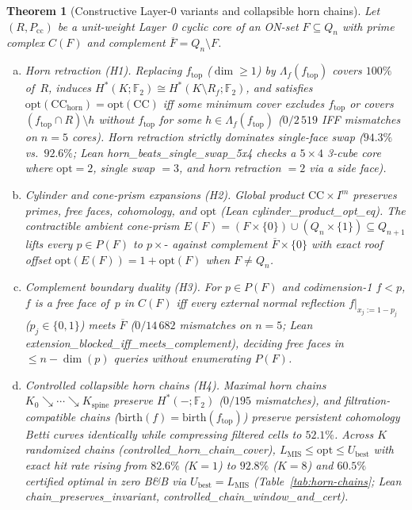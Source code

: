 \documentclass[11pt]{article}
\newtheorem{theorem}{Theorem}
\begin{document}
\begin{theorem}[Constructive Layer-0 variants and collapsible horn chains]
\label{thm:horn-chains}
Let $(R,P_{\mathrm{cc}})$ be a unit-weight Layer~0 cyclic core of an ON-set
$F\subseteq Q_n$ with prime complex $C(F)$ and complement $\overline{F}=Q_n\setminus F$.
\begin{enumerate}[(a)]
\item \emph{Horn retraction (H1).}  Replacing $f_{\mathrm{top}}$ ($\dim\ge 1$) by
$\Lambda_f(f_{\mathrm{top}})$ covers $100\%$ of~$R$, induces
$H^*(K;\mathbb{F}_2)\cong H^*(K\setminus R_f;\mathbb{F}_2)$, and satisfies
$\mathrm{opt}(\mathrm{CC}_{\mathrm{horn}})=\mathrm{opt}(\mathrm{CC})$ iff some
minimum cover excludes $f_{\mathrm{top}}$ or covers
$(f_{\mathrm{top}}\cap R)\setminus h$ without $f_{\mathrm{top}}$ for \emph{some}
$h\in\Lambda_f(f_{\mathrm{top}})$ ($0/2\,519$ IFF mismatches on $n=5$ cores).
Horn retraction strictly dominates single-face swap ($94.3\%$ vs.\ $92.6\%$; Lean
\textsf{horn\_beats\_single\_swap\_5x4} checks a $5\times 4$ 3-cube core where
$\mathrm{opt}=2$, single swap $=3$, and horn retraction $=2$ via a side face).
\item \emph{Cylinder and cone-prism expansions (H2).}  Global product
$\mathrm{CC}\times I^m$ preserves primes, free faces, cohomology, and $\mathrm{opt}$
(Lean \textsf{cylinder\_product\_opt\_eq}).  The contractible ambient cone-prism
$E(F)=(F\times\{0\})\cup(Q_n\times\{1\})\subseteq Q_{n+1}$ lifts every
$p\in P(F)$ to $p\times\texttt{-}$ against complement $\overline{F}\times\{0\}$
with exact roof offset $\mathrm{opt}(E(F))=1+\mathrm{opt}(F)$ when $F\neq Q_n$.
\item \emph{Complement boundary duality (H3).}  For $p\in P(F)$ and codimension-1
$f<p$, $f$ is a free face of~$p$ in $C(F)$ iff every external normal reflection
$f|_{x_j:=1-p_j}$ ($p_j\in\{0,1\}$) meets $\overline{F}$ ($0/14\,682$ mismatches
on $n=5$; Lean \textsf{extension\_blocked\_iff\_meets\_complement}), deciding free
faces in $\le n-\dim(p)$ queries without enumerating $P(F)$.
\item \emph{Controlled collapsible horn chains (H4).}  Maximal horn chains
$K_0\searrow\cdots\searrow K_{\mathrm{spine}}$ preserve $H^*(-;\mathbb{F}_2)$
($0/195$ mismatches), and filtration-compatible chains
($\mathrm{birth}(f)=\mathrm{birth}(f_{\mathrm{top}})$) preserve persistent
cohomology Betti curves identically while compressing filtered cells to $52.1\%$.
Across $K$ randomized chains (\textsf{controlled\_horn\_chain\_cover}),
$L_{\mathrm{MIS}}\le\mathrm{opt}\le U_{\mathrm{best}}$ with exact hit rate rising
from $82.6\%$ ($K=1$) to $92.8\%$ ($K=8$) and $60.5\%$ certified optimal in zero
B\&B via $U_{\mathrm{best}}=L_{\mathrm{MIS}}$ (Table~\ref{tab:horn-chains}; Lean
\textsf{chain\_preserves\_invariant}, \textsf{controlled\_chain\_window\_and\_cert}).
\end{enumerate}
\end{theorem}
\end{document}
